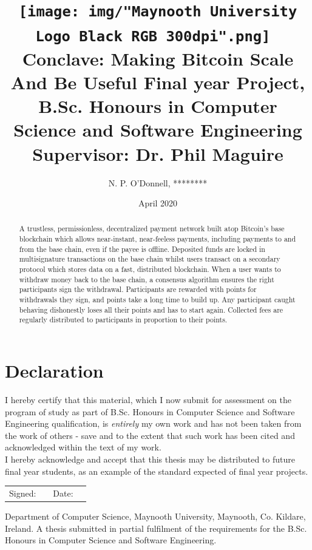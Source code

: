 \documentclass{report}
\title {
	\texttt{[image: img/"Maynooth University Logo Black RGB 300dpi".png]}~\\[1cm]
    {\textbf{Conclave: Making Bitcoin Scale And Be Useful}}
    \newline
    {\small{Final year Project, B.Sc. Honours in Computer Science and Software Engineering}}
    \newline
    {\small{Supervisor: Dr. Phil Maguire }}
}
\date{April 2020}
\author{N. P. O'Donnell, ********}
\begin{document}
\maketitle
\begin{abstract}
A trustless, permissionless, decentralized payment network built atop Bitcoin's base blockchain which allows near-instant, near-feeless payments, including payments to and from the base chain, even if the payee is offline. Deposited funds are locked in multisignature transactions on the base chain whilst users transact on a secondary protocol which stores data on a fast, distributed blockchain. When a user wants to withdraw money back to the base chain, a consensus algorithm ensures the right participants sign the withdrawal. Participants are rewarded with points for withdrawals they sign, and points take a long time to build up. Any participant caught behaving dishonestly loses all their points and has to start again. Collected fees are regularly distributed to participants in proportion to their points.
\end{abstract}
\section*{Declaration}
I hereby certify that this material, which I now submit for assessment on the program of study as part of  B.Sc. Honours in Computer Science and Software Engineering qualification, is \textit{entirely} my own work and has not been taken from the work of others - save and to the extent that such work has been cited and acknowledged within the text of my work. \\

I hereby acknowledge and accept that this thesis may be distributed to future final year students, as an example of the standard expected of final year projects. 
\newline
\newline
\newline
\newline
\begin{tabular}{p{1cm}p{7cm}p{1cm}p{5cm}}
Signed: & \hrulefill & Date: & \hrulefill \\
\end{tabular}
\vspace*{\fill}
\begin{center}
{
Department of Computer Science, Maynooth University, Maynooth, Co. Kildare, Ireland. A thesis submitted in partial fulfilment of the requirements for the B.Sc. Honours in Computer Science and Software Engineering.  
}
\end{center}
\end{document}
